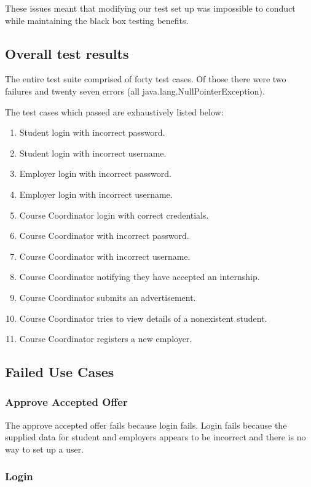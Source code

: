 \documentclass[11pt]{l3deliverable}
\begin{document}
These issues meant that modifying our test set up was impossible to conduct
while maintaining the black box testing benefits.

\subsection{Overall test results}

The entire test suite comprised of forty test cases. Of those there were two
failures and twenty seven errors (all java.lang.NullPointerException).

The test cases which passed are exhaustively listed below:

\begin{enumerate}
	\item Student login with incorrect password.
	\item Student login with incorrect username.
	\item Employer login with incorrect password.
	\item Employer login with incorrect username.
	\item Course Coordinator login with correct credentials.
	\item Course Coordinator with incorrect password.
	\item Course Coordinator with incorrect username.
	\item Course Coordinator notifying they have accepted an internship.
	\item Course Coordinator submits an advertisement.
	\item Course Coordinator tries to view details of a nonexistent student.
	\item Course Coordinator registers a new employer.
\end{enumerate}

\subsection{Failed Use Cases}

\subsubsection{Approve Accepted Offer}

The approve accepted offer fails because login fails. Login fails because the
supplied data for student and employers appears to be incorrect and there is
no way to set up a user.

\subsubsection{Login}
\end{document}
